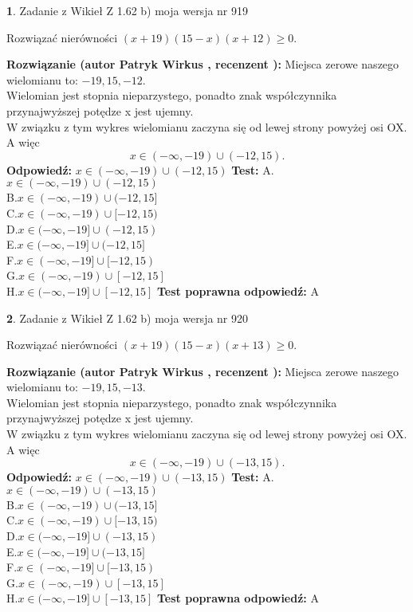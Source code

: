 \documentclass[12pt, a4paper]{article}
\theoremstyle{definition} %
\newtheorem{zad}{}
\newcommand{\zadStart}[1]{\begin{zad}#1\newline}
\newcommand{\zadStop}{\end{zad}}
\newcommand{\rozwStart}[2]{\noindent \textbf{Rozwiązanie (autor #1 , recenzent #2): }\newline}
\newcommand{\rozwStop}{\newline}
\newcommand{\odpStart}{\noindent \textbf{Odpowiedź:}\newline}
\newcommand{\odpStop}{\newline}
\newcommand{\testStart}{\noindent \textbf{Test:}\newline}
\newcommand{\testStop}{\newline}
\newcommand{\kluczStart}{\noindent \textbf{Test poprawna odpowiedź:}\newline}
\newcommand{\kluczStop}{\newline}
\begin{document}
\zadStart{Zadanie z Wikieł Z 1.62 b) moja wersja nr 919}

Rozwiązać nierówności $(x+19)(15-x)(x+12)\ge0$.
\zadStop
\rozwStart{Patryk Wirkus}{}
Miejsca zerowe naszego wielomianu to: $-19, 15, -12$.\\
Wielomian jest stopnia nieparzystego, ponadto znak współczynnika przy\linebreak najwyższej potędze x jest ujemny.\\ W związku z tym wykres wielomianu zaczyna się od lewej strony powyżej osi OX. A więc $$x \in (-\infty,-19) \cup (-12,15).$$
\rozwStop
\odpStart
$x \in (-\infty,-19) \cup (-12,15)$
\odpStop
\testStart
A.$x \in (-\infty,-19) \cup (-12,15)$\\
B.$x \in (-\infty,-19) \cup (-12,15]$\\
C.$x \in (-\infty,-19) \cup [-12,15)$\\
D.$x \in (-\infty,-19] \cup (-12,15)$\\
E.$x \in (-\infty,-19] \cup (-12,15]$\\
F.$x \in (-\infty,-19] \cup [-12,15)$\\
G.$x \in (-\infty,-19) \cup [-12,15]$\\
H.$x \in (-\infty,-19] \cup [-12,15]$
\testStop
\kluczStart
A
\kluczStop



\zadStart{Zadanie z Wikieł Z 1.62 b) moja wersja nr 920}

Rozwiązać nierówności $(x+19)(15-x)(x+13)\ge0$.
\zadStop
\rozwStart{Patryk Wirkus}{}
Miejsca zerowe naszego wielomianu to: $-19, 15, -13$.\\
Wielomian jest stopnia nieparzystego, ponadto znak współczynnika przy\linebreak najwyższej potędze x jest ujemny.\\ W związku z tym wykres wielomianu zaczyna się od lewej strony powyżej osi OX. A więc $$x \in (-\infty,-19) \cup (-13,15).$$
\rozwStop
\odpStart
$x \in (-\infty,-19) \cup (-13,15)$
\odpStop
\testStart
A.$x \in (-\infty,-19) \cup (-13,15)$\\
B.$x \in (-\infty,-19) \cup (-13,15]$\\
C.$x \in (-\infty,-19) \cup [-13,15)$\\
D.$x \in (-\infty,-19] \cup (-13,15)$\\
E.$x \in (-\infty,-19] \cup (-13,15]$\\
F.$x \in (-\infty,-19] \cup [-13,15)$\\
G.$x \in (-\infty,-19) \cup [-13,15]$\\
H.$x \in (-\infty,-19] \cup [-13,15]$
\testStop
\kluczStart
A
\kluczStop
\end{document}
